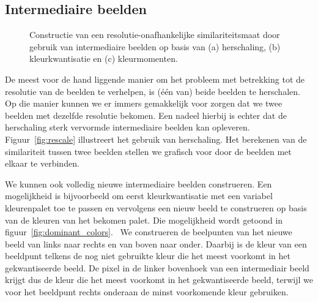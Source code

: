 \subsection{Intermediaire beelden}

\begin{figure}[bp]
\vspace{10pt}
\centering
{}
\qquad
{}
\qquad
{}
\caption{\label{fig:intermediaire_beelden}Constructie van een resolutie-onafhankelijke 
similariteitsmaat door gebruik van intermediaire beelden op basis van (a) herschaling, 
(b) kleurkwantisatie en (c) kleurmomenten.}
\end{figure}

De meest voor de hand liggende manier om het probleem met betrekking tot de resolutie van de beelden
te verhelpen, is (\'e\'en van) beide beelden te herschalen. Op die manier kunnen we er immers gemakkelijk 
voor zorgen dat we twee beelden met dezelfde resolutie bekomen. Een nadeel hierbij is echter dat de
herschaling sterk vervormde intermediaire beelden kan opleveren. Figuur~\ref{fig:rescale} illustreert
het gebruik van herschaling. Het berekenen van de similariteit tussen twee beelden stellen we grafisch
voor door de beelden met elkaar te verbinden. 

We kunnen ook volledig nieuwe intermediaire beelden construeren. Een mogelijkheid is bijvoorbeeld om
eerst kleurkwantisatie met een variabel kleurenpalet toe te passen en vervolgens een
nieuw beeld te construeren op basis van de kleuren van het bekomen palet. Die mogelijkheid wordt getoond
in figuur~\ref{fig:dominant_colors}.  We construeren de beelpunten 
van het nieuwe beeld van links naar rechts en van boven naar onder. Daarbij is de kleur van een beeldpunt 
telkens de nog niet gebruikte kleur die het meest voorkomt in het gekwantiseerde beeld. 
De pixel in de linker bovenhoek van een intermediair beeld krijgt dus de kleur die het meest voorkomt
in het gekwantiseerde beeld, terwijl we voor het beeldpunt rechts onderaan de minst voorkomende kleur
gebruiken. 

